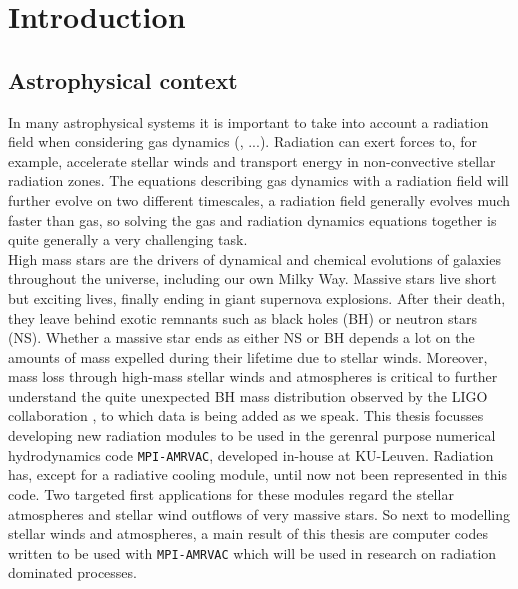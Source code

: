 \chapter{Introduction}
\section{Astrophysical context}
In many astrophysical systems it is important to take into account a radiation field when considering gas dynamics (\citep{Tetsu2016},  ...). Radiation can exert forces to, for example, accelerate stellar winds and transport energy in non-convective stellar radiation zones. The equations describing gas dynamics with a radiation field will further evolve on two different timescales, a radiation field generally evolves much faster than gas, so solving the gas and radiation dynamics equations together is quite generally a very challenging task. \\

High mass stars are the drivers of dynamical and chemical evolutions of galaxies throughout the universe, including our own Milky Way. Massive stars live short but exciting lives, finally ending in giant supernova explosions. After their death, they leave behind exotic remnants such as black holes (BH) or neutron stars (NS). Whether a massive star ends as either NS or BH depends a lot on the amounts of mass expelled during their lifetime due to stellar winds. Moreover, mass loss through high-mass stellar winds and atmospheres is critical to further understand the quite unexpected BH mass distribution observed by the LIGO collaboration \citep{Abbott1}, to which data is being added as we speak. This thesis focusses developing new radiation modules to be used in the gerenral purpose numerical hydrodynamics code \texttt{MPI-AMRVAC}, developed in-house at KU-Leuven. Radiation has, except for a radiative cooling module, until now not been represented in this code. Two targeted first applications for these modules regard the stellar atmospheres and stellar wind outflows of very massive stars. So next to modelling stellar winds and atmospheres, a main result of this thesis are computer codes written to be used with \texttt{MPI-AMRVAC} which will be used in research on radiation dominated processes.\\

